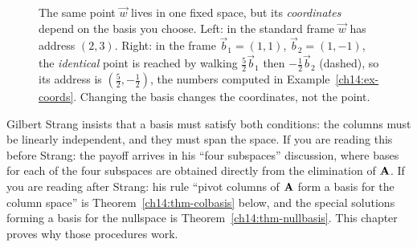 \begin{figure}[htbp]
\centering
{}
\caption{The same point $\vec{w}$ lives in one fixed space, but its
\emph{coordinates} depend on the basis you choose. Left: in the standard frame
$\vec{w}$ has address $(2,3)$. Right: in the frame $\vec{b}_1=(1,1)$,
$\vec{b}_2=(1,-1)$, the \emph{identical} point is reached by walking
$\tfrac52\vec{b}_1$ then $-\tfrac12\vec{b}_2$ (dashed), so its address is
$(\tfrac52,-\tfrac12)$, the numbers computed in Example~\ref{ch14:ex-coords}.
Changing the basis changes the coordinates, not the point.}
\label{ch14:fig-frames}
\end{figure}

\begin{strangbox}
Gilbert Strang insists that a basis must satisfy both conditions: the
columns must be linearly independent, and they must span the space. If you are
reading this before Strang: the payoff arrives in his ``four subspaces''
discussion, where bases for each of the four subspaces are obtained directly
from the elimination of $\mathbf{A}$. If you are reading after Strang:
his rule ``pivot columns of $\mathbf{A}$ form a basis for the column space'' is
Theorem~\ref{ch14:thm-colbasis} below, and the special solutions forming a
basis for the nullspace is Theorem~\ref{ch14:thm-nullbasis}. This chapter
proves why those procedures work.
\end{strangbox}

